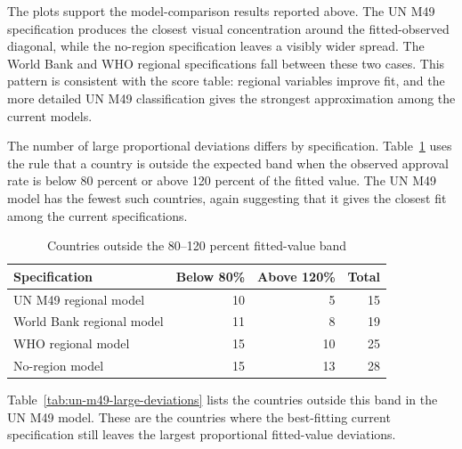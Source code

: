 \documentclass[runningheads]{llncs}
\begin{document}
The plots support the model-comparison results reported above. The UN M49 specification produces the closest visual concentration around the fitted-observed diagonal, while the no-region specification leaves a visibly wider spread. The World Bank and WHO regional specifications fall between these two cases. This pattern is consistent with the score table: regional variables improve fit, and the more detailed UN M49 classification gives the strongest approximation among the current models.

The number of large proportional deviations differs by specification. Table~\ref{tab:large-proportional-deviations} uses the rule that a country is outside the expected band when the observed approval rate is below 80 percent or above 120 percent of the fitted value. The UN M49 model has the fewest such countries, again suggesting that it gives the closest fit among the current specifications.

\begin{table}
\caption{Countries outside the 80--120 percent fitted-value band}
\label{tab:large-proportional-deviations}
\centering
\renewcommand{\arraystretch}{1.2}
\setlength{\tabcolsep}{7pt}
\begin{tabular}{lrrr}
\hline
Specification & Below 80\% & Above 120\% & Total \\
\hline
UN M49 regional model & 10 & 5 & 15 \\
World Bank regional model & 11 & 8 & 19 \\
WHO regional model & 15 & 10 & 25 \\
No-region model & 15 & 13 & 28 \\
\hline
\end{tabular}
\end{table}

Table~\ref{tab:un-m49-large-deviations} lists the countries outside this band in the UN M49 model. These are the countries where the best-fitting current specification still leaves the largest proportional fitted-value deviations.
\end{document}
